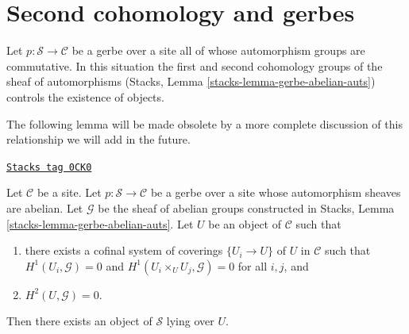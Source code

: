 \section{Second cohomology and gerbes}
\label{sites-cohomology-section-gerbes}
Let $p : \mathcal{S} \to \mathcal{C}$ be a gerbe over a site
all of whose automorphism groups are commutative. In this situation
the first and second cohomology groups of the sheaf of automorphisms
(Stacks, Lemma \ref{stacks-lemma-gerbe-abelian-auts})
controls the existence of objects.

\medskip\noindent
The following lemma will be made obsolete by a more complete
discussion of this relationship we will add in the future.

\begin{lemma}[Existence]
\label{sites-cohomology-lemma-existence}
\href{https://stacks.math.columbia.edu/tag/0CK0}{\texttt{Stacks tag 0CK0}}

Let $\mathcal{C}$ be a site. Let $p : \mathcal{S} \to \mathcal{C}$
be a gerbe over a site whose automorphism sheaves are abelian.
Let $\mathcal{G}$ be the sheaf of abelian groups constructed
in Stacks, Lemma \ref{stacks-lemma-gerbe-abelian-auts}.
Let $U$ be an object of $\mathcal{C}$ such that
\begin{enumerate}
\item there exists a cofinal system of coverings $\{U_i \to U\}$
of $U$ in $\mathcal{C}$ such that $H^1(U_i, \mathcal{G}) = 0$ and
$H^1(U_i \times_U U_j, \mathcal{G}) = 0$
for all $i, j$, and
\item $H^2(U, \mathcal{G}) = 0$.
\end{enumerate}
Then there exists an object of $\mathcal{S}$ lying over $U$.
\end{lemma}

